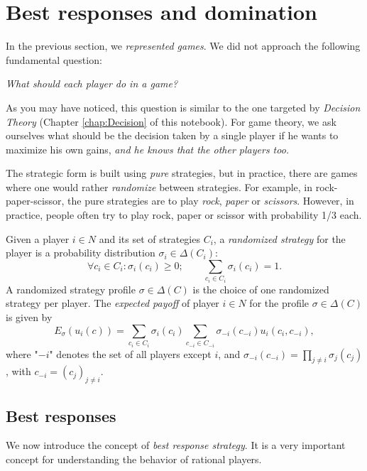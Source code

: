 \section{Best responses and domination}

In the previous section, we \emph{represented games}. We did not approach the following fundamental question:
\begin{center}
 \textit{What should each player do in a game?} 
 \end{center}

As you may have noticed, this question is similar to the one targeted by \emph{Decision Theory} (Chapter \ref{chap:Decision} of this notebook). For game theory, we ask ourselves what should be the decision taken by a single player if he wants to maximize his own gains, \emph{and he knows that the other players too.}



The strategic form is built using \emph{pure} strategies, but in practice, there are games where one would rather \emph{randomize} between strategies. For example,  in rock-paper-scissor, the pure strategies are to play \emph{rock},  \emph{paper} or \emph{scissors}. However, in practice, people often try to play rock, paper or scissor with probability 1/3 each.

\begin{definition}
Given a player $i \in N$ and its set of strategies $C_i$, a \emph{randomized strategy} for the player is a probability distribution $\sigma_i \in \Delta(C_i)$:
$$ \forall c_i \in C_i: \sigma_i(c_i) \geq 0; \qquad \sum_{c_i \in C_i} \sigma_i(c_i) = 1.$$
A randomized strategy profile $\sigma \in \Delta(C)$ is the choice of one randomized strategy per player.
The \emph{expected payoff} of player $i \in N$ for the profile $\sigma \in \Delta(C)$ is given by 
$$E_\sigma(u_i(c)) = \sum_{c_i \in C_i} \sigma_i(c_i) \sum_{c_{-i} \in C_{-i}} \sigma_{-i}(c_{-i}) u_i(c_i, c_{-i}), $$
where "$-i$" denotes the set of all players except $i$, and 
$\sigma_{-i}(c_{-i}) = \prod_{j \neq i}\sigma_{j}(c_j)$, with $c_{-i} = (c_j)_{j \neq i}$. 
\end{definition}

\subsection{Best responses}
\label{chap2:subsec:BR}
We now introduce the concept of \emph{best response strategy}. It is a very important concept for understanding the behavior of rational players.

